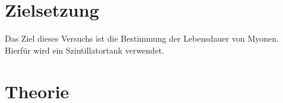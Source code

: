 \section{Zielsetzung}
\label{sec:Zielsetzung}
Das Ziel dieses Versuchs ist die Bestimmung der Lebensdauer von Myonen. Hierfür wird ein Szintillatortank verwendet.

\section{Theorie}
\label{sec:Theorie}

